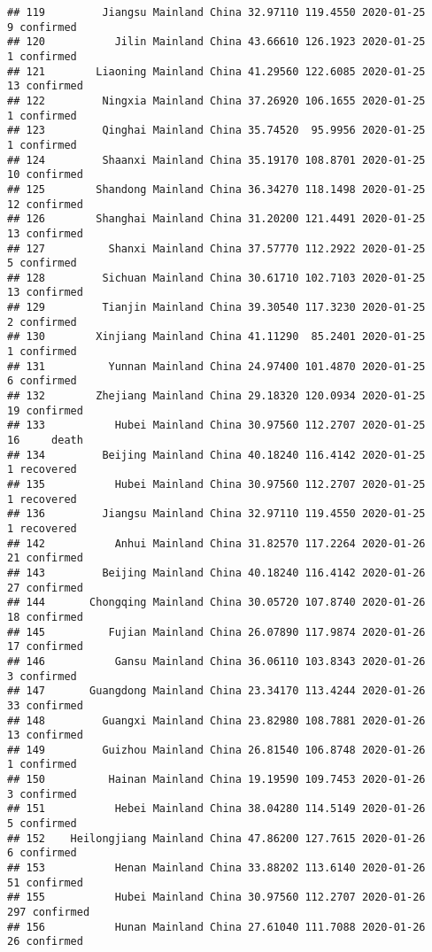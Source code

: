 \documentclass[
]{article}
\begin{document}
\begin{verbatim}
## 119         Jiangsu Mainland China 32.97110 119.4550 2020-01-25     9 confirmed
## 120           Jilin Mainland China 43.66610 126.1923 2020-01-25     1 confirmed
## 121        Liaoning Mainland China 41.29560 122.6085 2020-01-25    13 confirmed
## 122         Ningxia Mainland China 37.26920 106.1655 2020-01-25     1 confirmed
## 123         Qinghai Mainland China 35.74520  95.9956 2020-01-25     1 confirmed
## 124         Shaanxi Mainland China 35.19170 108.8701 2020-01-25    10 confirmed
## 125        Shandong Mainland China 36.34270 118.1498 2020-01-25    12 confirmed
## 126        Shanghai Mainland China 31.20200 121.4491 2020-01-25    13 confirmed
## 127          Shanxi Mainland China 37.57770 112.2922 2020-01-25     5 confirmed
## 128         Sichuan Mainland China 30.61710 102.7103 2020-01-25    13 confirmed
## 129         Tianjin Mainland China 39.30540 117.3230 2020-01-25     2 confirmed
## 130        Xinjiang Mainland China 41.11290  85.2401 2020-01-25     1 confirmed
## 131          Yunnan Mainland China 24.97400 101.4870 2020-01-25     6 confirmed
## 132        Zhejiang Mainland China 29.18320 120.0934 2020-01-25    19 confirmed
## 133           Hubei Mainland China 30.97560 112.2707 2020-01-25    16     death
## 134         Beijing Mainland China 40.18240 116.4142 2020-01-25     1 recovered
## 135           Hubei Mainland China 30.97560 112.2707 2020-01-25     1 recovered
## 136         Jiangsu Mainland China 32.97110 119.4550 2020-01-25     1 recovered
## 142           Anhui Mainland China 31.82570 117.2264 2020-01-26    21 confirmed
## 143         Beijing Mainland China 40.18240 116.4142 2020-01-26    27 confirmed
## 144       Chongqing Mainland China 30.05720 107.8740 2020-01-26    18 confirmed
## 145          Fujian Mainland China 26.07890 117.9874 2020-01-26    17 confirmed
## 146           Gansu Mainland China 36.06110 103.8343 2020-01-26     3 confirmed
## 147       Guangdong Mainland China 23.34170 113.4244 2020-01-26    33 confirmed
## 148         Guangxi Mainland China 23.82980 108.7881 2020-01-26    13 confirmed
## 149         Guizhou Mainland China 26.81540 106.8748 2020-01-26     1 confirmed
## 150          Hainan Mainland China 19.19590 109.7453 2020-01-26     3 confirmed
## 151           Hebei Mainland China 38.04280 114.5149 2020-01-26     5 confirmed
## 152    Heilongjiang Mainland China 47.86200 127.7615 2020-01-26     6 confirmed
## 153           Henan Mainland China 33.88202 113.6140 2020-01-26    51 confirmed
## 155           Hubei Mainland China 30.97560 112.2707 2020-01-26   297 confirmed
## 156           Hunan Mainland China 27.61040 111.7088 2020-01-26    26 confirmed

\end{verbatim}
\end{document}
